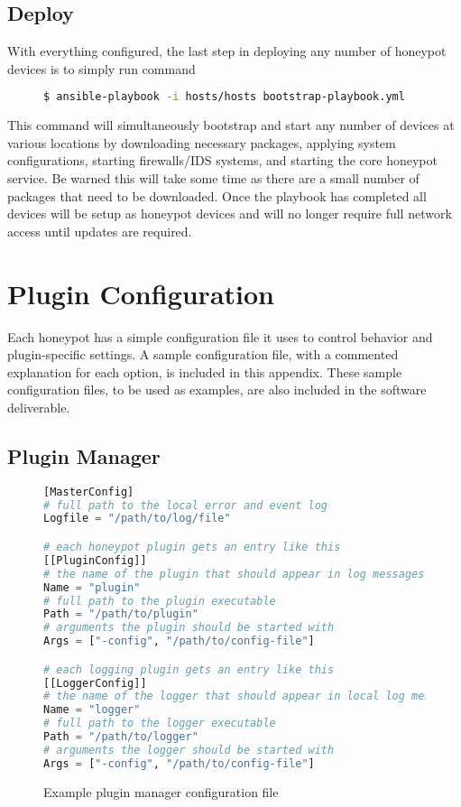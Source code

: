\subsection{Deploy}
With everything configured, the last step in deploying any number of honeypot devices is to simply run command

\begin{figure}[H]
\small
\begin{lstlisting}[language=Bash,frame=single]
$ ansible-playbook -i hosts/hosts bootstrap-playbook.yml
\end{lstlisting}
\end{figure}

This command will simultaneously bootstrap and start any number of devices at various locations by downloading necessary packages, applying system configurations, starting firewalls/IDS systems, and starting the core honeypot service. Be warned this will take some time as there are a small number of packages that need to be downloaded. Once the playbook has completed all devices will be setup as honeypot devices and will no longer require full network access until updates are required.

\section{Plugin Configuration}

Each honeypot has a simple configuration file it uses to control behavior and
plugin-specific settings. A sample configuration file, with a commented
explanation for each option, is included in this appendix. These sample
configuration files, to be used as examples, are also included in the
software deliverable.

\subsection{Plugin Manager}

\begin{figure}[H]
\begin{lstlisting}[language=Python,frame=single]
[MasterConfig]
# full path to the local error and event log
Logfile = "/path/to/log/file"

# each honeypot plugin gets an entry like this
[[PluginConfig]]
# the name of the plugin that should appear in log messages
Name = "plugin"
# full path to the plugin executable
Path = "/path/to/plugin"
# arguments the plugin should be started with
Args = ["-config", "/path/to/config-file"]

# each logging plugin gets an entry like this
[[LoggerConfig]]
# the name of the logger that should appear in local log messages
Name = "logger"
# full path to the logger executable
Path = "/path/to/logger"
# arguments the logger should be started with
Args = ["-config", "/path/to/config-file"]
\end{lstlisting}
\caption{Example plugin manager configuration file}
\end{figure}


